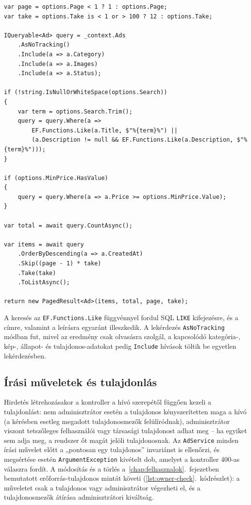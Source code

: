 \begin{lstlisting}[language={[Sharp]C}, caption={Szerveroldali lapozás és feltételes szűrés az \texttt{AdService.GetPagedAsync} metódusban (kivonat)}, label={lst:ads-paged}]
var page = options.Page < 1 ? 1 : options.Page;
var take = options.Take is < 1 or > 100 ? 12 : options.Take;

IQueryable<Ad> query = _context.Ads
    .AsNoTracking()
    .Include(a => a.Category)
    .Include(a => a.Images)
    .Include(a => a.Status);

if (!string.IsNullOrWhiteSpace(options.Search))
{
    var term = options.Search.Trim();
    query = query.Where(a =>
        EF.Functions.Like(a.Title, $"%{term}%") ||
        (a.Description != null && EF.Functions.Like(a.Description, $"%{term}%")));
}

if (options.MinPrice.HasValue)
{
    query = query.Where(a => a.Price >= options.MinPrice.Value);
}

var total = await query.CountAsync();

var items = await query
    .OrderByDescending(a => a.CreatedAt)
    .Skip((page - 1) * take)
    .Take(take)
    .ToListAsync();

return new PagedResult<Ad>(items, total, page, take);
\end{lstlisting}

A keresés az \texttt{EF.Functions.Like} függvénnyel fordul SQL \texttt{LIKE} kifejezésre, és a
címre, valamint a leírásra egyaránt illeszkedik. A lekérdezés \texttt{AsNoTracking} módban fut,
mivel az eredmény csak olvasásra szolgál, a kapcsolódó kategória-, kép-, állapot- és
tulajdonos-adatokat pedig \texttt{Include} hívások töltik be egyetlen lekérdezésben.

\subsection{Írási műveletek és tulajdonlás}

Hirdetés létrehozásakor a kontroller a hívó szerepétől függően kezeli a tulajdonlást: nem
adminisztrátor esetén a tulajdonos kényszerítetten maga a hívó (a kérésben esetleg megadott
tulajdonosmezők felülíródnak), adminisztrátor viszont tetszőleges felhasználói vagy társasági
tulajdonost adhat meg -- ha egyiket sem adja meg, a rendszer őt magát jelöli tulajdonosnak. Az
\texttt{AdService} minden írási művelet előtt a „pontosan egy tulajdonos” invariánst is ellenőrzi,
és megsértése esetén \texttt{ArgumentException} kivételt dob, amelyet a kontroller 400-as
válaszra fordít. A módosítás és a törlés a~\ref{chap:felhasznalok}.~fejezetben bemutatott
erőforrás-tulajdonos mintát követi (\ref{lst:owner-check}.~kódrészlet): a műveletet csak a
tulajdonos vagy adminisztrátor végezheti el, és a tulajdonosmezők átírása adminisztrátori
kiváltság.

